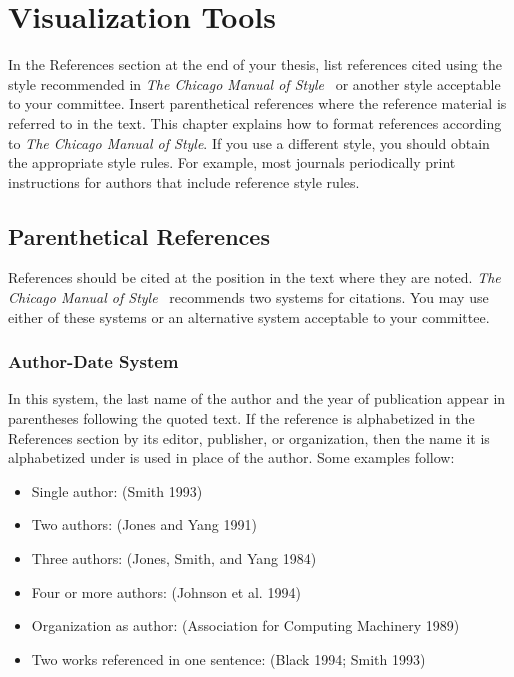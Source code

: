 \chapter{Visualization Tools}
\label{cpt:tools}

In the References section at the end of your thesis, list references
cited using the style recommended in \textit{The Chicago Manual of
Style}~\cite{ChicagoManual} or another style acceptable to your
committee.  Insert parenthetical references where the reference
material is referred to in the text.  This chapter explains how to
format references according to \textit{The Chicago Manual of Style}.  If you
use a different style, you should obtain the appropriate style rules.
For example, most journals periodically print instructions for authors
that include reference style rules.

\section{Parenthetical References}

References should be cited at the position in the text where they are
noted.  \textit{The Chicago Manual of Style}~\cite{ChicagoManual} recommends
two systems for citations.  You may use either of these systems or an
alternative system acceptable to your committee.

\subsection{Author-Date System}

In this system, the last name of the author and the year of
publication appear in parentheses following the quoted text.  If the
reference is alphabetized in the References section by its editor,
publisher, or organization, then the name it is alphabetized under is
used in place of the author.  Some examples follow:
\begin{itemize}
 \item Single author: (Smith 1993)
 \item Two authors: (Jones and Yang 1991)
 \item Three authors: (Jones, Smith, and Yang 1984)
 \item Four or more authors: (Johnson et al. 1994)
 \item Organization as author: (Association for Computing Machinery 1989)
 \item Two works referenced in one sentence: (Black 1994; Smith 1993)
\end{itemize}

